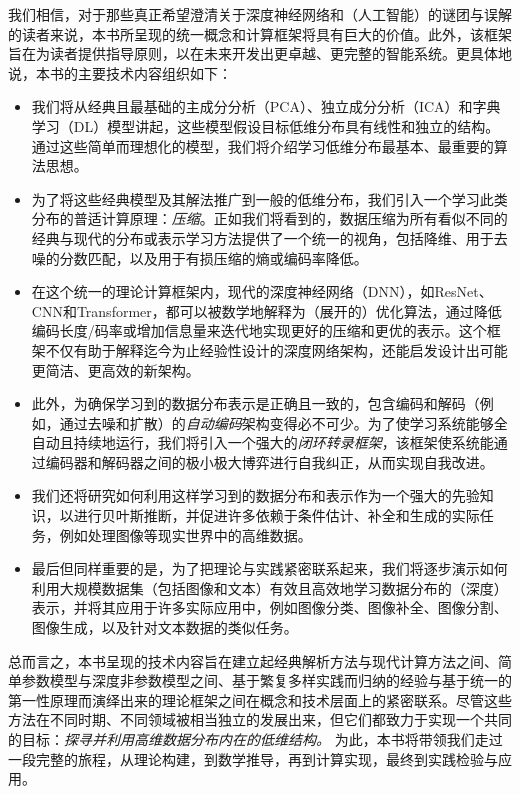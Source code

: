 \documentclass[../../book-main.tex]{subfiles}
\begin{document}
我们相信，对于那些真正希望澄清关于深度神经网络和（人工智能）的谜团与误解的读者来说，本书所呈现的统一概念和计算框架将具有巨大的价值。此外，该框架旨在为读者提供指导原则，以在未来开发出更卓越、更完整的智能系统。更具体地说，本书的主要技术内容组织如下：
\begin{itemize}
\item 我们将从经典且最基础的主成分分析（PCA）、独立成分分析（ICA）和字典学习（DL）模型讲起，这些模型假设目标低维分布具有线性和独立的结构。通过这些简单而理想化的模型，我们将介绍学习低维分布最基本、最重要的算法思想。

\item 为了将这些经典模型及其解法推广到一般的低维分布，我们引入一个学习此类分布的普适计算原理：{\em 压缩}。正如我们将看到的，数据压缩为所有看似不同的经典与现代的分布或表示学习方法提供了一个统一的视角，包括降维、用于去噪的分数匹配，以及用于有损压缩的熵或编码率降低。

\item 在这个统一的理论计算框架内，现代的深度神经网络（DNN），如ResNet、CNN和Transformer，都可以被数学地解释为（展开的）优化算法，通过降低编码长度/码率或增加信息量来迭代地实现更好的压缩和更优的表示。这个框架不仅有助于解释迄今为止经验性设计的深度网络架构，还能启发设计出可能更简洁、更高效的新架构。

\item 此外，为确保学习到的数据分布表示是正确且一致的，包含编码和解码（例如，通过去噪和扩散）的{\em 自动编码}架构变得必不可少。为了使学习系统能够全自动且持续地运行，我们将引入一个强大的{\em 闭环转录框架}，该框架使系统能通过编码器和解码器之间的极小极大博弈进行自我纠正，从而实现自我改进。

\item 我们还将研究如何利用这样学习到的数据分布和表示作为一个强大的先验知识，以进行贝叶斯推断，并促进许多依赖于条件估计、补全和生成的实际任务，例如处理图像等现实世界中的高维数据。

\item 最后但同样重要的是，为了把理论与实践紧密联系起来，我们将逐步演示如何利用大规模数据集（包括图像和文本）有效且高效地学习数据分布的（深度）表示，并将其应用于许多实际应用中，例如图像分类、图像补全、图像分割、图像生成，以及针对文本数据的类似任务。
\end{itemize}

总而言之，本书呈现的技术内容旨在建立起经典解析方法与现代计算方法之间、简单参数模型与深度非参数模型之间、基于繁复多样实践而归纳的经验与基于统一的第一性原理而演绎出来的理论框架之间在概念和技术层面上的紧密联系。尽管这些方法在不同时期、不同领域被相当独立的发展出来，但它们都致力于实现一个共同的目标：{\em 探寻并利用高维数据分布内在的低维结构。} 为此，本书将带领我们走过一段完整的旅程，从理论构建，到数学推导，再到计算实现，最终到实践检验与应用。
\end{document}
